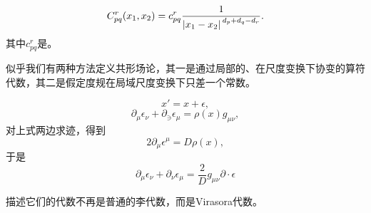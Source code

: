 \begin{equation}
    C_{pq}^r(x_1, x_2) = c_{pq}^r \frac{1}{\abs*{x_1 - x_2}^{d_p + d_q - d_r}}.
\end{equation}
其中$c_{pq}^r$是。

似乎我们有两种方法定义共形场论，其一是通过局部的、在尺度变换下协变的算符代数，其二是假定度规在局域尺度变换下只差一个常数。

\begin{equation}
    x' = x + \epsilon,
\end{equation}
\begin{equation}
    \partial_\mu \epsilon_\nu + \partial_\ni \epsilon_\mu = \rho(x) g_{\mu \nu},
\end{equation}
对上式两边求迹，得到
\[
    2 \partial_\mu \epsilon^\mu = D \rho(x),
\]
于是
\begin{equation}
    \partial_\mu \epsilon_\nu + \partial_\nu \epsilon_\mu = \frac{2}{D} g_{\mu \nu} \partial \cdot \epsilon
\end{equation}



描述它们的代数不再是普通的李代数，而是Virasora代数。